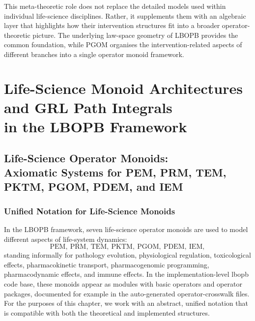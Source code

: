 \documentclass[11pt]{book}
\theoremstyle{plain}
\theoremstyle{definition}
\theoremstyle{remark}
\begin{document}
This meta-theoretic role does not replace the detailed models used
within individual life-science disciplines. Rather, it supplements
them with an algebraic layer that highlights how their intervention
structures fit into a broader operator-theoretic picture. The
underlying law-space geometry of LBOPB provides the common foundation,
while PGOM organises the intervention-related aspects of different
branches into a single operator monoid framework.



\part[Life-Science Monoid Architectures and GRL Path Integrals]{Life-Science Monoid Architectures and GRL Path Integrals\\
      in the LBOPB Framework}

\chapter[Life-Science Operator Monoids: Axiomatic Systems]{Life-Science Operator Monoids:\\
         Axiomatic Systems for PEM, PRM, TEM, PKTM, PGOM, PDEM, and IEM}


\section{Unified Notation for Life-Science Monoids}


In the LBOPB framework, seven life-science operator monoids are used
to model different aspects of life-system dynamics:
\[
  \text{PEM},\ \text{PRM},\ \text{TEM},\ \text{PKTM},\ \text{PGOM},\ 
  \text{PDEM},\ \text{IEM},
\]
standing informally for pathology evolution, physiological regulation,
toxicological effects, pharmacokinetic transport, pharmacogenomic
programming, pharmacodynamic effects, and immune effects. In the
implementation-level lbopb code base, these monoids appear as modules
with basic operators and operator packages, documented for example in
the auto-generated operator-crosswalk files. For the purposes of this
chapter, we work with an abstract, unified notation that is compatible
with both the theoretical and implemented structures.
\end{document}
